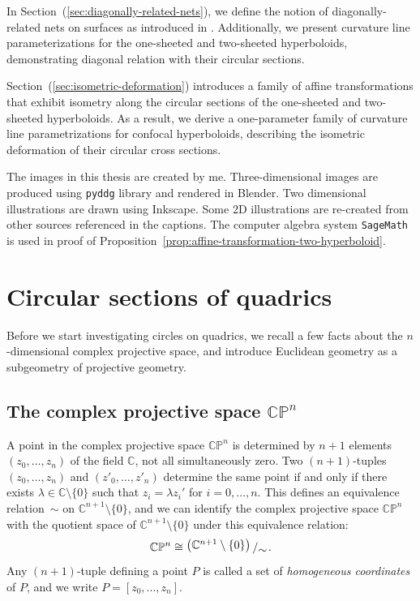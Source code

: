 \documentclass[10pt, a4paper]{article}
\newcommand{\bigslant}[2]{{\raisebox{.2em}{$#1$}\left/\raisebox{-.2em}{$#2$}\right.}}
\theoremstyle{BoldTopSpacing}
\theoremstyle{BoldTopSpacing}
\theoremstyle{BoldTopSpacing}
\theoremstyle{BoldTopBottomSpacing}
\theoremstyle{BoldTopSpacing}
\theoremstyle{BoldTopBottomSpacing}
\theoremstyle{remark}
\begin{document}
In Section~(\ref{sec:diagonally-related-nets}), we define the notion of diagonally-related nets on surfaces as introduced in \cite{MutuallyDiagonalNets2019}. Additionally, we present curvature line parameterizations for the one-sheeted and two-sheeted hyperboloids, demonstrating diagonal relation with their circular sections. \par
Section~(\ref{sec:isometric-deformation}) introduces a family of affine transformations that exhibit isometry along the circular sections of the one-sheeted and two-sheeted hyperboloids. As a result, we derive a one-parameter family of curvature line parametrizations for confocal hyperboloids, describing the isometric deformation of their circular cross sections. \par
The images in this thesis are created by me. Three-dimensional images are produced using \texttt{pyddg} library and rendered in Blender. Two dimensional illustrations are drawn using Inkscape. Some 2D illustrations are re-created from other sources referenced in the captions. The computer algebra system \texttt{SageMath} is used in proof of Proposition~\ref{prop:affine-transformation-two-hyperboloid}.
\pagebreak
\section{Circular sections of quadrics}
\label{sec:circular-sections-of-quadrics}

Before we start investigating circles on quadrics, we recall a few facts about the $n$-dimensional complex projective space, and introduce Euclidean geometry as a subgeometry of projective geometry. \par

\subsection{The complex projective space $\mathbb{C}\mathbb{P}^n$}
\label{subsec:complex-projective-space}

A point in the complex projective space $\mathbb{C}\mathbb{P}^{n}$ is determined by $n + 1$ elements $(z_{0}, \dots, z_{n})$ of the field $\mathbb{C}$, not all simultaneously zero. Two $(n + 1)$-tuples $(z_{0}, \dots, z_{n})$ and $(z'_{0}, \dots, z'_{n})$ determine the same point if and only if there exists $\lambda \in \mathbb{C} \setminus \{ 0 \}$ such that $z_{i} = \lambda z_{i}'$ for $i = 0, \dots, n$. This defines an equivalence relation~$\sim$ on $\mathbb{C}^{n + 1} \setminus \{ 0 \}$, and we can identify the complex projective space $\mathbb{C}\mathbb{P}^n$ with the quotient space of $\mathbb{C}^{n + 1} \setminus \{ 0 \}$ under this equivalence relation:
\[
    \mathbb{C}\mathbb{P}^n \cong \bigslant{\left( \mathbb{C}^{n + 1} \setminus \{ 0 \} \right)}{\sim}.
\]
Any $(n+1)$-tuple defining a point $P$ is called a set of \textit{homogeneous coordinates} of $P$, and we write $P = [z_{0},\dots, z_{n}]$.\par
\end{document}
